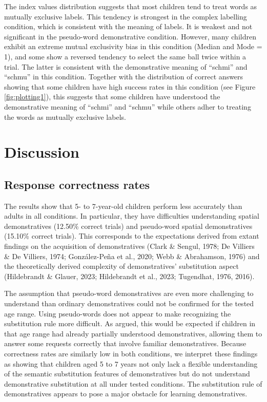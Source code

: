 \documentclass[
  man,floatsintext]{apa6}
\begin{document}
The index values distribution suggests that most children tend to treat words as mutually exclusive labels. This tendency is strongest in the complex labelling condition, which is consistent with the meaning of labels. It is weakest and not significant in the pseudo-word demonstrative condition. However, many children exhibit an extreme mutual exclusivity bias in this condition (Median and Mode = 1), and some show a reversed tendency to select the same ball twice within a trial. The latter is consistent with the demonstrative meaning of ``schmi'' and ``schmu'' in this condition. Together with the distribution of correct answers showing that some children have high success rates in this condition (see Figure \ref{fig:plotting1}), this suggests that some children have understood the demonstrative meaning of ``schmi'' and ``schmu'' while others adher to treating the words as mutually exclusive labels.

\section{Discussion}\label{discussion}

\subsection{Response correctness rates}\label{response-correctness-rates}

The results show that 5- to 7-year-old children perform less accurately than adults in all conditions. In particular, they have difficulties understanding spatial demonstratives (12.50\% correct trials) and pseudo-word spatial demonstratives (15.10\% correct trials). This corresponds to the expectations derived from extant findings on the acquisition of demonstratives (Clark \& Sengul, 1978; De Villiers \& De Villiers, 1974; González-Peña et al., 2020; Webb \& Abrahamson, 1976) and the theoretically derived complexity of demonstratives' substitution aspect (Hildebrandt \& Glauer, 2023; Hildebrandt et al., 2023; Tugendhat, 1976, 2016).

The assumption that pseudo-word demonstratives are even more challenging to understand than ordinary demonstratives could not be confirmed for the tested age range. Using pseudo-words does not appear to make recognizing the substitution rule more difficult. As argued, this would be expected if children in that age range had already partially understood demonstratives, allowing them to answer some requests correctly that involve familiar demonstratives. Because correctness rates are similarly low in both conditions, we interpret these findings as showing that children aged 5 to 7 years not only lack a flexible understanding of the semantic substitution features of demonstratives but do not understand demonstrative substitution at all under tested conditions. The substitution rule of demonstratives appears to pose a major obstacle for learning demonstratives.
\end{document}
